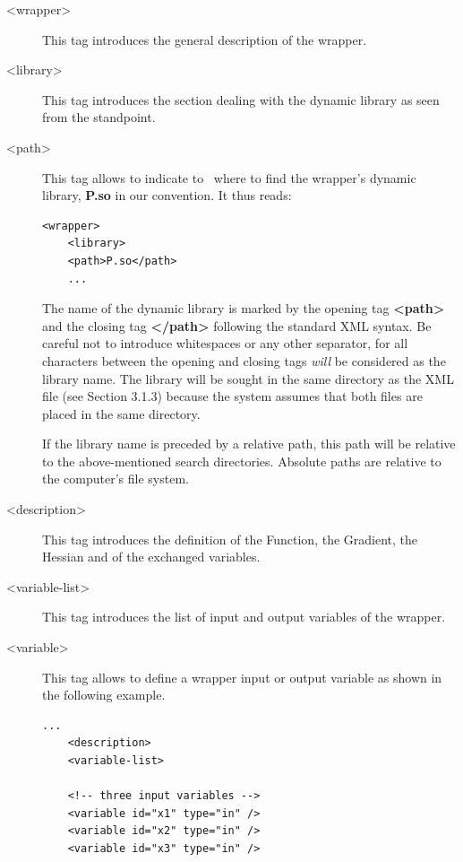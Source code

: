 \begin{description}
\item[<wrapper>] This tag introduces the general description of the wrapper.

\item[<library>] This tag introduces the section dealing with the dynamic library as seen from the \OT standpoint.

\item[<path>] This tag allows to indicate to \OT\ where to find the wrapper's dynamic library, {\bf P.so} in our convention. It thus reads:

  \lstset{language=XML, basicstyle=\normalsize}
  \begin{lstlisting}[frame=TBRL]
    <wrapper>
    <library>
    <path>P.so</path>
    ...
  \end{lstlisting}

  The name of the dynamic library is marked by the opening tag {\bf <path>} and the closing tag {\bf </path>} following the standard XML syntax. Be careful not to introduce whitespaces or any other separator, for all characters between the opening and closing tags \emph{will} be considered as the library name. The library will be sought in the same directory as the XML file (see Section 3.1.3) because the system assumes that both files are placed in the same directory.

  If the library name is preceded by a relative path, this path will be relative to the above-mentioned search directories. Absolute paths are relative to the computer's file system.

\item[<description>] This tag introduces the definition of the Function, the Gradient, the Hessian and of the exchanged variables.

\item[<variable-list>] This tag introduces the list of input and output variables of the wrapper.

\item[<variable>] This tag allows to define a wrapper input or output variable  as shown in the following example.

  \lstset{language=XML, basicstyle=\normalsize}
  \begin{lstlisting}[frame=TBRL]
    ...
    <description>
    <variable-list>

    <!-- three input variables -->
    <variable id="x1" type="in" />
    <variable id="x2" type="in" />
    <variable id="x3" type="in" />


\end{lstlisting}
\end{description}
